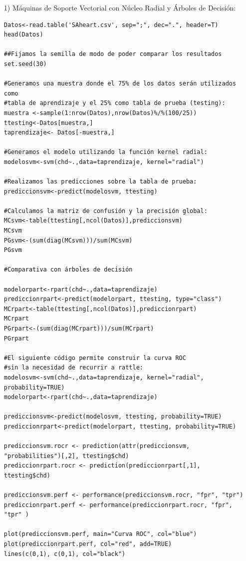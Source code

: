 \documentclass[11pt,a4paper]{report}
\begin{document}
\begin{itemize}
\item[1)]
Máquinas de Soporte Vectorial con Núcleo Radial y Árboles de Decisión:

\begin{verbatim} 
Datos<-read.table('SAheart.csv', sep=";", dec=".", header=T) 
head(Datos)

##Fijamos la semilla de modo de poder comparar los resultados
set.seed(30)

#Generamos una muestra donde el 75% de los datos serán utilizados como 
#tabla de aprendizaje y el 25% como tabla de prueba (testing):
muestra <-sample(1:nrow(Datos),nrow(Datos)%/%(100/25)) 
ttesting<-Datos[muestra,]
taprendizaje<- Datos[-muestra,]

#Generamos el modelo utilizando la función kernel radial:
modelosvm<-svm(chd~.,data=taprendizaje, kernel="radial") 

#Realizamos las predicciones sobre la tabla de prueba:
prediccionsvm<-predict(modelosvm, ttesting) 

#Calculamos la matriz de confusión y la precisión global:
MCsvm<-table(ttesting[,ncol(Datos)],prediccionsvm) 
MCsvm
PGsvm<-(sum(diag(MCsvm)))/sum(MCsvm)
PGsvm

#Comparativa con árboles de decisión

modelorpart<-rpart(chd~.,data=taprendizaje)
prediccionrpart<-predict(modelorpart, ttesting, type="class")
MCrpart<-table(ttesting[,ncol(Datos)],prediccionrpart) 
MCrpart
PGrpart<-(sum(diag(MCrpart)))/sum(MCrpart)
PGrpart

#El siguiente código permite construir la curva ROC 
#sin la necesidad de recurrir a rattle:
modelosvm<-svm(chd~.,data=taprendizaje, kernel="radial", probability=TRUE)
modelorpart<-rpart(chd~.,data=taprendizaje)

prediccionsvm<-predict(modelosvm, ttesting, probability=TRUE)
prediccionrpart<-predict(modelorpart, ttesting, probability=TRUE)

prediccionsvm.rocr <- prediction(attr(prediccionsvm, "probabilities")[,2], ttesting$chd)
prediccionrpart.rocr <- prediction(prediccionrpart[,1], ttesting$chd)

prediccionsvm.perf <- performance(prediccionsvm.rocr, "fpr", "tpr")
prediccionrpart.perf <- performance(prediccionrpart.rocr, "fpr", "tpr" )

plot(prediccionsvm.perf, main="Curva ROC", col="blue")
plot(prediccionrpart.perf, col="red", add=TRUE)
lines(c(0,1), c(0,1), col="black")


\end{verbatim}
\end{itemize}
\end{document}
